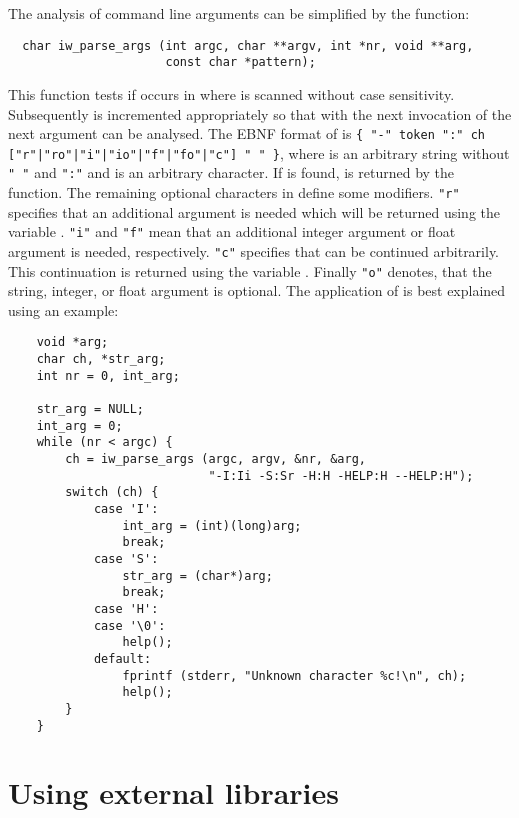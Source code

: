 The analysis of command line arguments can be simplified by the
function:
\begin{small}
\linespread{0.9}
\begin{verbatim}
  char iw_parse_args (int argc, char **argv, int *nr, void **arg,
                      const char *pattern);
\end{verbatim}
\end{small}
This function tests if  occurs in  where
 is scanned without case sensitivity. Subsequently
 is incremented appropriately so that with the next
invocation of  the next argument can be
analysed. The EBNF format of  is
\verb#{ "-" token ":" ch ["r"|"ro"|"i"|"io"|"f"|"fo"|"c"] " " }#,
where  is an arbitrary string without \verb|" "| and
\verb|":"| and  is an arbitrary character. If 
is found,  is returned by the function. The remaining
optional characters in  define some
modifiers. \verb|"r"| specifies that an additional argument is
needed which will be returned using the variable
. \verb|"i"| and \verb|"f"| mean that an additional integer
argument or float argument is needed, respectively. \verb|"c"|
specifies that  can be continued arbitrarily. This
continuation is returned using the variable . Finally
\verb|"o"| denotes, that the string, integer, or float argument is
optional. The application of  is best
explained using an example:
\begin{small}
\linespread{0.9}
\begin{verbatim}
    void *arg;
    char ch, *str_arg;
    int nr = 0, int_arg;

    str_arg = NULL;
    int_arg = 0;
    while (nr < argc) {
        ch = iw_parse_args (argc, argv, &nr, &arg,
                            "-I:Ii -S:Sr -H:H -HELP:H --HELP:H");
        switch (ch) {
            case 'I':
                int_arg = (int)(long)arg;
                break;
            case 'S':
                str_arg = (char*)arg;
                break;
            case 'H':
            case '\0':
                help();
            default:
                fprintf (stderr, "Unknown character %c!\n", ch);
                help();
        }
    }
\end{verbatim}
\end{small}

\section{Using external libraries}

